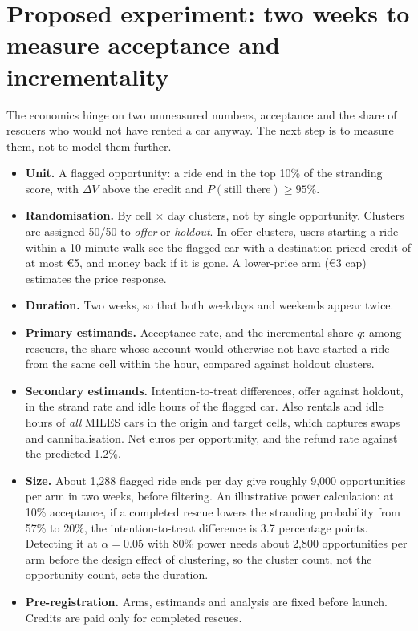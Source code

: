 \documentclass[11pt,a4paper]{article}
\newcommand{\eur}[1]{\euro{}#1}
\begin{document}
\section{Proposed experiment: two weeks to measure acceptance and incrementality}\label{sec:ab}

The economics hinge on two unmeasured numbers, acceptance and the share of rescuers who would not have rented a car anyway. The next step is to measure them, not to model them further.
\begin{itemize}
\item \textbf{Unit.} A flagged opportunity: a ride end in the top 10\% of the stranding score, with $\Delta V$ above the credit and $P(\text{still there}) \geq 95\%$.
\item \textbf{Randomisation.} By cell $\times$ day clusters, not by single opportunity. Clusters are assigned 50/50 to \emph{offer} or \emph{holdout}. In offer clusters, users starting a ride within a 10-minute walk see the flagged car with a destination-priced credit of at most \eur{5}, and money back if it is gone. A lower-price arm (\eur{3} cap) estimates the price response.
\item \textbf{Duration.} Two weeks, so that both weekdays and weekends appear twice.
\item \textbf{Primary estimands.} Acceptance rate, and the incremental share $q$: among rescuers, the share whose account would otherwise not have started a ride from the same cell within the hour, compared against holdout clusters.
\item \textbf{Secondary estimands.} Intention-to-treat differences, offer against holdout, in the strand rate and idle hours of the flagged car. Also rentals and idle hours of \emph{all} MILES cars in the origin and target cells, which captures swaps and cannibalisation. Net euros per opportunity, and the refund rate against the predicted 1.2\%.
\item \textbf{Size.} About 1,288 flagged ride ends per day give roughly 9,000 opportunities per arm in two weeks, before filtering. An illustrative power calculation: at 10\% acceptance, if a completed rescue lowers the stranding probability from 57\% to 20\%, the intention-to-treat difference is 3.7 percentage points. Detecting it at $\alpha = 0.05$ with 80\% power needs about 2,800 opportunities per arm before the design effect of clustering, so the cluster count, not the opportunity count, sets the duration.
\item \textbf{Pre-registration.} Arms, estimands and analysis are fixed before launch. Credits are paid only for completed rescues.
\end{itemize}
\end{document}

